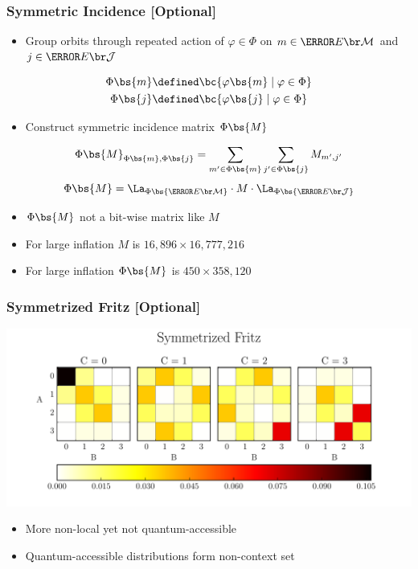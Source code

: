 \documentclass[
    hyperref={bookmarks=false},%
    xcolor={dvipsnames},
]{beamer}
\renewcommand{\term}[1]{\textcolor{Mahogany}{#1}}
\renewcommand{\tcdot}{\cdot} %
\begin{document}
\begin{frame}
    \frametitle{Symmetric Incidence [Optional]}
    \begin{itemize}
        \item Group orbits through repeated action of $\varphi \in \Phi$ on $m \in \Events{\mscenario}$ and $j \in \Events{\jointvar}$
    \end{itemize}
    \begin{align*}
        \Phi\bs{m} &\defined \bc{\varphi\bs{m} \mid \varphi \in \Phi} \\
        \Phi\bs{j} &\defined \bc{\varphi\bs{j} \mid \varphi \in \Phi}
    \end{align*}
    \begin{itemize}
        \item Construct \term{symmetric incidence matrix} $\Phi\bs{M}$
    \end{itemize}
    \[ \Phi\bs{M}_{\Phi\bs{m}, \Phi\bs{j}} = \sum_{m' \in \Phi\bs{m}}\sum_{j' \in \Phi\bs{j}} M_{m',j'} \]
    \[ \Phi\bs{M} = \La_{\Phi\bs{\Events{\mscenario}}}\tcdot M \tcdot \La_{\Phi\bs{\Events{\jointvar}}} \]
    \begin{itemize}
        \item $\Phi\bs{M}$ not a bit-wise matrix like $M$
        \item For large inflation $M$ is $16,896 \times 16,777,216$
        \item For large inflation $\Phi\bs{M}$ is $450 \times 358,120$ %
    \end{itemize}
\end{frame}

\begin{frame}
    \frametitle{Symmetrized Fritz [Optional]}
    \begin{center}
        \includegraphics[width=\linewidth]{../../figures/distributions/symmetrized_fritz.pdf}
    \end{center}
    \begin{itemize}
        \item More non-local yet not quantum-accessible
        \item Quantum-accessible distributions form non-context set
    \end{itemize}
\end{frame}
\end{document}
